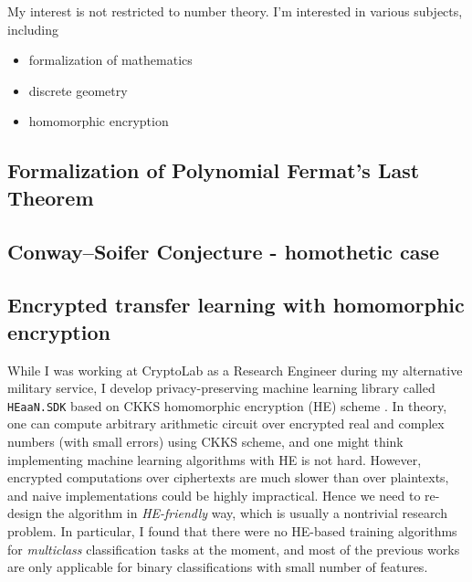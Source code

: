 \documentclass[12pt]{article}
\begin{document}
My interest is not restricted to number theory. I'm interested in various subjects, including
\begin{itemize}
    \item formalization of mathematics
    \item discrete geometry
    \item homomorphic encryption
\end{itemize}




\subsection*{Formalization of Polynomial Fermat's Last Theorem}

\subsection*{Conway--Soifer Conjecture - homothetic case}


\subsection*{Encrypted transfer learning with homomorphic encryption}

While I was working at CryptoLab as a Research Engineer during my alternative military service, I develop privacy-preserving machine learning library called \texttt{HEaaN.SDK} \cite{heaansdk} based on CKKS homomorphic encryption (HE) scheme \cite{cheon2017homomorphic}.
In theory, one can compute arbitrary arithmetic circuit over encrypted real and complex numbers (with small errors) using CKKS scheme, and one might think implementing machine learning algorithms with HE is not hard.
However, encrypted computations over ciphertexts are much slower than over plaintexts, and naive implementations could be highly impractical.
Hence we need to re-design the algorithm in \emph{HE-friendly} way, which is usually a nontrivial research problem.
In particular, I found that there were no HE-based training algorithms for \emph{multiclass} classification tasks at the moment, and most of the previous works are only applicable for binary classifications with small number of features.
\end{document}
